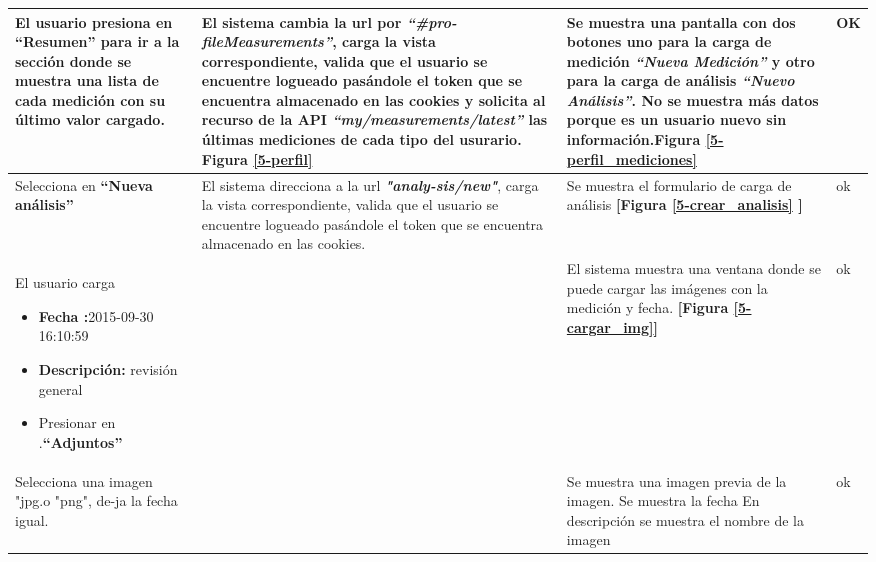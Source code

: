 {\begin{longtable}{|p{4cm}|p{4cm}|p{4cm}|p{3cm}|}
  			
  			El usuario presiona en \textbf{``Resumen'' } para ir a la sección donde se muestra una lista de cada medición con su último valor cargado.
  			
  			& El sistema cambia la url por \textit{\textbf{``\#pro-fileMeasurements''}}, carga la vista correspondiente, valida que el usuario se encuentre logueado pasándole el token que se encuentra almacenado en las cookies y solicita al recurso de la API \textit{\textbf{``my/measurements/latest'' }}las últimas mediciones de cada tipo del usurario. \textbf{Figura \ref{5-perfil}}
  			
  			& Se muestra una pantalla con dos botones uno para la carga de medición
  			\textit{\textbf{``Nueva Medición'' }}y otro para la carga de análisis \textit{\textbf{``Nuevo Análisis''}}. No se muestra más datos porque es un usuario nuevo sin información.\textbf{Figura \ref{5-perfil_mediciones}}
  			& OK
  			\\ \hline
  			
  			
  			
  			Selecciona en \textbf{``Nueva análisis'' }
  			& El sistema direcciona a la url \textit{\textbf{"analy-sis/new"}}, carga la vista correspondiente, valida que el usuario se encuentre logueado pasándole el token que se encuentra almacenado en las cookies.
  			
  			& Se muestra el formulario de carga de análisis \textbf{[Figura \ref{5-crear_analisis} ]}
  			& ok
  			\\ \hline
  			
  			
  			
  			El usuario carga
  			
  			\begin{itemize}
  				\item \textbf{Fecha :}2015-09-30 16:10:59
  				\item \textbf{Descripción: }revisión general
  				\item Presionar en .\textbf{``Adjuntos''}
  				
  			\end{itemize}
  			
  			&
  			& El sistema muestra una ventana donde se puede cargar las imágenes con la medición y fecha.\textbf{ [Figura  \ref{5-cargar_img}]}
  			&ok
  			
  			\\ \hline
  			
  			
  			
  			Selecciona una imagen "jpg.o "png", de-ja la fecha igual. 
  			&
  			& Se muestra una imagen previa de la imagen. Se muestra la fecha En descripción se muestra el nombre de la imagen
  			& ok
  			\\ \hline
  			

\end{longtable}}
